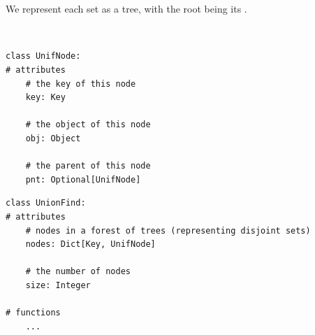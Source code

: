 \documentclass[mathserif, handout]{beamer}
\begin{document}
\begin{frame}
\begin{minipage}{0.33\textwidth}
\begin{figure}
\end{figure}
\end{minipage}
\\~\\[2mm]
We represent each set as a tree, with the root being its .
\end{frame}

\begin{frame}[fragile]
\begin{thmboxtop}
 \\
\begin{lstlisting}[style=mypython]
class UnifNode:
# attributes
    # the key of this node
    key: Key

    # the object of this node
    obj: Object

    # the parent of this node
    pnt: Optional[UnifNode]
\end{lstlisting}
\end{thmboxtop}    
\end{frame}

\begin{frame}[fragile]
\begin{thmboxbot}
\begin{lstlisting}[style=mypython]
class UnionFind:
# attributes
    # nodes in a forest of trees (representing disjoint sets)
    nodes: Dict[Key, UnifNode]
    
    # the number of nodes
    size: Integer

# functions
    ...
\end{lstlisting}
\end{thmboxbot}    
\end{frame}
\end{document}

